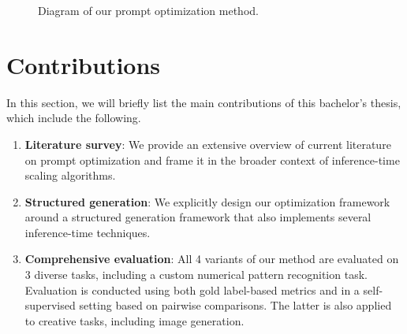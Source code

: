 \begin{figure}[ht]
    \caption{Diagram of our prompt optimization method.}
    \label{fig:methoddiagram}
\end{figure}

\newpage
\section{Contributions}
In this section, we will briefly list the main contributions of this bachelor's thesis, which include the following. 
\begin{enumerate}
    \item \textbf{Literature survey}: We provide an extensive overview of current literature on prompt optimization and frame it in the broader context of inference-time scaling algorithms.
    \item \textbf{Structured generation}: We explicitly design our optimization framework around a structured generation framework that also implements several inference-time techniques.
    \item \textbf{Comprehensive evaluation}: All 4 variants of our method are evaluated on 3 diverse tasks, including a custom numerical pattern recognition task. Evaluation is conducted using both gold label-based metrics and in a self-supervised setting based on pairwise comparisons. The latter is also applied to creative tasks, including image generation.
\end{enumerate}

